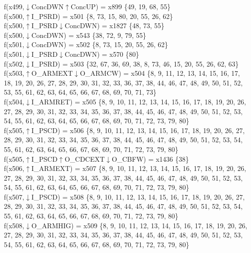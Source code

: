 f(x499,$\downarrow$ConcDWN$\uparrow$ConcUP) = x899 \{49, 19, 68, 55\} \\  
f(x500,$\uparrow$I\_PSRD) = x501 \{8, 73, 15, 80, 20, 55, 26, 62\} \\  
f(x500,$\uparrow$I\_PSRD$\downarrow$ConcDWN) = x1827 \{48, 73, 55\} \\  
f(x500,$\downarrow$ConcDWN) = x543 \{38, 72, 9, 79, 55\} \\  
f(x501,$\downarrow$ConcDWN) = x502 \{8, 73, 15, 20, 55, 26, 62\} \\  
f(x501,$\downarrow$I\_PSRD$\downarrow$ConcDWN) = x570 \{80\} \\  
f(x502,$\downarrow$I\_PSRD) = x503 \{32, 67, 36, 69, 38, 8, 73, 46, 15, 20, 55, 26, 62, 63\} \\  
f(x503,$\uparrow$O\_ARMEXT$\downarrow$O\_ARMCW) = x504 \{8, 9, 11, 12, 13, 14, 15, 16, 17, 18, 19, 20, 26, 27, 28, 29, 30, 31, 32, 33, 36, 37, 38, 44, 46, 47, 48, 49, 50, 51, 52, 53, 55, 61, 62, 63, 64, 65, 66, 67, 68, 69, 70, 71, 73\} \\  
f(x504,$\downarrow$I\_ARMRET) = x505 \{8, 9, 10, 11, 12, 13, 14, 15, 16, 17, 18, 19, 20, 26, 27, 28, 29, 30, 31, 32, 33, 34, 35, 36, 37, 38, 44, 45, 46, 47, 48, 49, 50, 51, 52, 53, 54, 55, 61, 62, 63, 64, 65, 66, 67, 68, 69, 70, 71, 72, 73, 79, 80\} \\  
f(x505,$\uparrow$I\_PSCD) = x506 \{8, 9, 10, 11, 12, 13, 14, 15, 16, 17, 18, 19, 20, 26, 27, 28, 29, 30, 31, 32, 33, 34, 35, 36, 37, 38, 44, 45, 46, 47, 48, 49, 50, 51, 52, 53, 54, 55, 61, 62, 63, 64, 65, 66, 67, 68, 69, 70, 71, 72, 73, 79, 80\} \\  
f(x505,$\uparrow$I\_PSCD$\uparrow$O\_CDCEXT$\downarrow$O\_CBFW) = x1436 \{38\} \\  
f(x506,$\uparrow$I\_ARMEXT) = x507 \{8, 9, 10, 11, 12, 13, 14, 15, 16, 17, 18, 19, 20, 26, 27, 28, 29, 30, 31, 32, 33, 34, 35, 36, 37, 38, 44, 45, 46, 47, 48, 49, 50, 51, 52, 53, 54, 55, 61, 62, 63, 64, 65, 66, 67, 68, 69, 70, 71, 72, 73, 79, 80\} \\  
f(x507,$\downarrow$I\_PSCD) = x508 \{8, 9, 10, 11, 12, 13, 14, 15, 16, 17, 18, 19, 20, 26, 27, 28, 29, 30, 31, 32, 33, 34, 35, 36, 37, 38, 44, 45, 46, 47, 48, 49, 50, 51, 52, 53, 54, 55, 61, 62, 63, 64, 65, 66, 67, 68, 69, 70, 71, 72, 73, 79, 80\} \\  
f(x508,$\downarrow$O\_ARMHIG) = x509 \{8, 9, 10, 11, 12, 13, 14, 15, 16, 17, 18, 19, 20, 26, 27, 28, 29, 30, 31, 32, 33, 34, 35, 36, 37, 38, 44, 45, 46, 47, 48, 49, 50, 51, 52, 53, 54, 55, 61, 62, 63, 64, 65, 66, 67, 68, 69, 70, 71, 72, 73, 79, 80\} \\  
